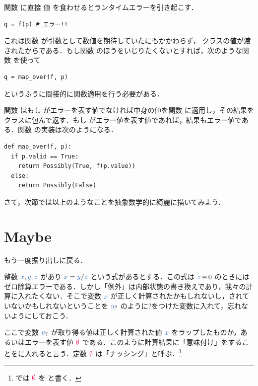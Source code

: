 \documentclass[a5paper,twoside,fleqn,draft]{jsbook}
\begin{document}
関数  に直接  値  を食わせるとランタイムエラーを引き起こす．
\begin{pythoncode}
\begin{verbatim}
q = f(p) # エラー!!
\end{verbatim}
\end{pythoncode}
これは関数  が引数として数値を期待していたにもかかわらず， クラスの値が渡されたからである．もし関数  のほうをいじりたくないとすれば，次のような関数  を使って
\begin{pythoncode}
\begin{verbatim}
q = map_over(f, p)
\end{verbatim}
\end{pythoncode}
というふうに間接的に関数適用を行う必要がある．

関数  はもし  がエラーを表す値でなければ中身の値を関数  に適用し，その結果を  クラスに包んで返す．もし  がエラー値を表す値であれば，結果もエラー値である．関数  の実装は次のようになる．
\begin{pythoncode}
\begin{verbatim}
def map_over(f, p):
  if p.valid == True:
    return Possibly(True, f(p.value))
  else:
    return Possibly(False)
\end{verbatim}
\end{pythoncode}

さて，次節では以上のようなことを抽象数学的に綺麗に描いてみよう．

\section{Maybe}

もう一度振り出しに戻る．

整数 $\hVar{x},\hVar{y},\hVar{z}$ があり $\hVar{x}=\hVar{y}/\hVar{z}$ という式があるとする．この式は $\hVar{z}\hIfEq0$ のときにはゼロ除算エラーである．しかし「例外」は内部状態の書き換えであり，我々の計算に入れたくない．そこで変数 $\hVar{x}$ が正しく計算されたかもしれないし，されていないかもしれないということを $\mMaybe{u}$ のように?をつけた変数に入れて，忘れないようにしておこう．

ここで変数 $\mMaybe{u}$ が取り得る値は正しく計算された値 $\hVar{x}$ をラップしたものか，あるいはエラーを表す値 $\mNothing$ である．このように計算結果に「意味付け」をすることをに入れると言う．定数 $\mNothing$ は「ナッシング」と呼ぶ．\footnote{\haskell では $\mNothing$ を  と書く．}
\end{document}
